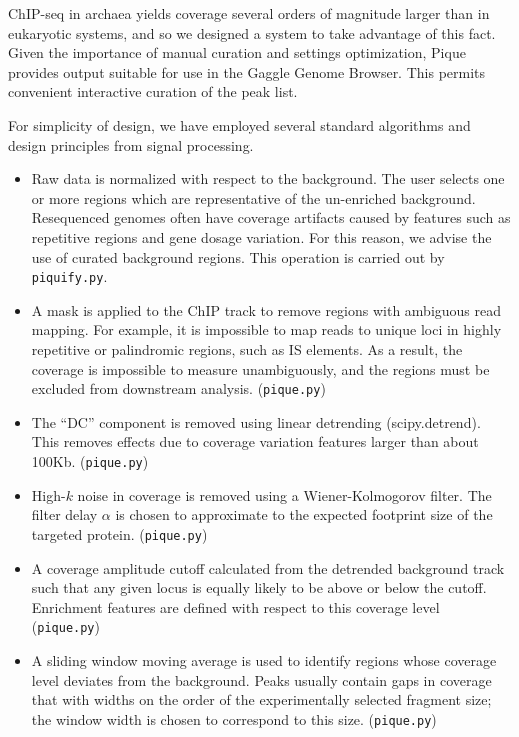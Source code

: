 \documentclass{article}
\begin{document}

ChIP-seq in archaea yields coverage several orders of magnitude larger
than in eukaryotic systems, and so we designed a system to take
advantage of this fact. Given the importance of manual curation and
settings optimization, Pique provides output suitable for use in the
Gaggle Genome Browser. This permits convenient interactive curation of
the peak list. 

For simplicity of design, we have employed several standard algorithms
and design principles from signal processing.

\begin{itemize}

\item Raw data is normalized with respect to the background. The user
  selects one or more regions which are representative of the
  un-enriched background. Resequenced genomes often have coverage
  artifacts caused by features such as repetitive regions and gene
  dosage variation. For this reason, we advise the use of curated
  background regions. This operation is carried out by
  \texttt{piquify.py}.

\item A mask is applied to the ChIP track to remove regions with
  ambiguous read mapping. For example, it is impossible to map reads
  to unique loci in highly repetitive or palindromic regions, such as
  IS elements. As a result, the coverage is impossible to measure
  unambiguously, and the regions must be excluded from downstream
  analysis. (\texttt{pique.py})

\item The ``DC'' component is removed using linear detrending
  (scipy.detrend). This removes effects due to coverage variation
  features larger than about 100Kb. (\texttt{pique.py})

\item High-$k$ noise in coverage is removed using a Wiener-Kolmogorov
  filter. The filter delay $\alpha$ is chosen to approximate to the
  expected footprint size of the targeted protein. (\texttt{pique.py})

\item A coverage amplitude cutoff calculated from the detrended
  background track such that any given locus is equally likely to be
  above or below the cutoff. Enrichment features are defined with
  respect to this coverage level (\texttt{pique.py})

\item A sliding window moving average is used to identify regions
  whose coverage level deviates from the background. Peaks usually
  contain gaps in coverage that with widths on the order of the
  experimentally selected fragment size; the window width is chosen to
  correspond to this size. (\texttt{pique.py})



\end{itemize}
\end{document}
